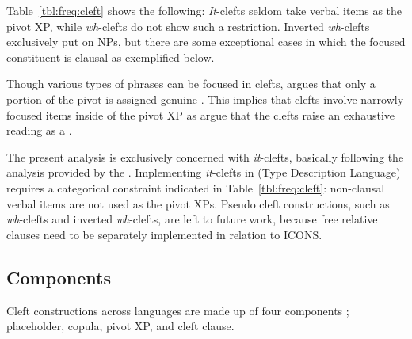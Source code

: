 Table~\ref{tbl:freq:cleft} shows the following: \textit{It}-clefts
seldom take verbal items as the pivot XP, while \textit{wh}-clefts do
not show such a restriction.  Inverted \textit{wh}-clefts exclusively
put  on NPs, but there are some exceptional cases in which the
focused constituent is clausal as exemplified below.





\noindent Though various types of phrases can be focused in clefts,
\citet{velleman:etal:12} argues that only a portion of the pivot is
assigned genuine . This implies that clefts involve narrowly
focused items inside of the pivot XP as \citet{beaver:clark:08} argue
that the clefts raise an exhaustive reading as a .



The present analysis is exclusively concerned with \textit{it}-clefts,
basically following the analysis provided by the .  Implementing
\textit{it}-clefts in  (Type Description Language)
requires a categorical constraint indicated
in Table~\ref{tbl:freq:cleft}: non-clausal verbal items are not used
as the pivot XPs.  Pseudo cleft constructions, such as
\textit{wh}-clefts and inverted \textit{wh}-clefts, are left to future
work, because free relative clauses need to be separately implemented
in relation to ICONS.


\subsection{Components}
\label{10:sssec:clefts:components}

Cleft constructions across languages are made up of four components
\citep{gundel:02,kim:yang:09,kim:12a};  placeholder,  copula,
pivot XP, and cleft clause.






